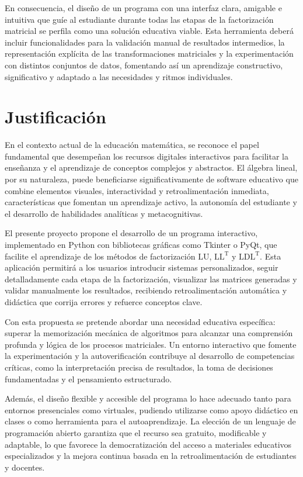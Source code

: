 \noindent En consecuencia, el diseño de un programa con una interfaz clara, amigable e intuitiva que guíe al estudiante durante todas las etapas de la factorización matricial se perfila como una solución educativa viable. Esta herramienta deberá incluir funcionalidades para la validación manual de resultados intermedios, la representación explícita de las transformaciones matriciales y la experimentación con distintos conjuntos de datos, fomentando así un aprendizaje constructivo, significativo y adaptado a las necesidades y ritmos individuales.

\section{Justificación}

\noindent En el contexto actual de la educación matemática, se reconoce el papel fundamental que desempeñan los recursos digitales interactivos para facilitar la enseñanza y el aprendizaje de conceptos complejos y abstractos. El álgebra lineal, por su naturaleza, puede beneficiarse significativamente de software educativo que combine elementos visuales, interactividad y retroalimentación inmediata, características que fomentan un aprendizaje activo, la autonomía del estudiante y el desarrollo de habilidades analíticas y metacognitivas.

El presente proyecto propone el desarrollo de un programa interactivo, implementado en Python con bibliotecas gráficas como Tkinter o PyQt, que facilite el aprendizaje de los métodos de factorización $\mathrm{LU}$, $\mathrm{LL^T}$ y $\mathrm{LDL^T}$. Esta aplicación permitirá a los usuarios introducir sistemas personalizados, seguir detalladamente cada etapa de la factorización, visualizar las matrices generadas y validar manualmente los resultados, recibiendo retroalimentación automática y didáctica que corrija errores y refuerce conceptos clave.

\noindent Con esta propuesta se pretende abordar una necesidad educativa específica: superar la memorización mecánica de algoritmos para alcanzar una comprensión profunda y lógica de los procesos matriciales. Un entorno interactivo que fomente la experimentación y la autoverificación contribuye al desarrollo de competencias críticas, como la interpretación precisa de resultados, la toma de decisiones fundamentadas y el pensamiento estructurado.

\noindent Además, el diseño flexible y accesible del programa lo hace adecuado tanto para entornos presenciales como virtuales, pudiendo utilizarse como apoyo didáctico en clases o como herramienta para el autoaprendizaje. La elección de un lenguaje de programación abierto garantiza que el recurso sea gratuito, modificable y adaptable, lo que favorece la democratización del acceso a materiales educativos especializados y la mejora continua basada en la retroalimentación de estudiantes y docentes.

